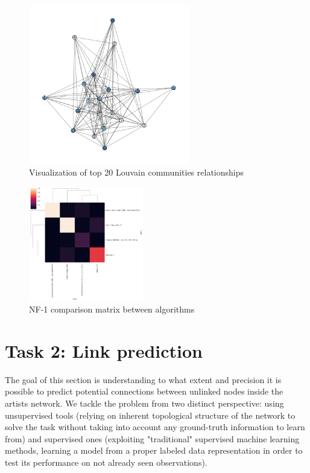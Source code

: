 \documentclass[sigchi]{acmart}
\begin{document}
\begin{figure}[H]
\centering
\includegraphics[width=7cm]{img/louvain_graph.png}
\caption{Visualization of top 20 Louvain communities relationships}
\label{fig: boxplot_community}
\end{figure}

\begin{figure}[H]
\centering
\includegraphics[width=5cm]{img/normalized_mi.png}
\caption{NF-1 comparison matrix between algorithms}
\label{fig: NMINFO}
\end{figure}



\section{Task 2: Link prediction}
The goal of this section is understanding to what extent and precision it is possible to predict potential connections between unlinked nodes inside the artists network. We tackle the problem from two distinct perspective: using unsupervised tools (relying on inherent topological structure of the network to solve the task without taking into account any ground-truth information to learn from) and supervised ones (exploiting "traditional" supervised machine learning methods, learning a model from a proper labeled data representation in order to test its performance on not already seen observations).
\end{document}
